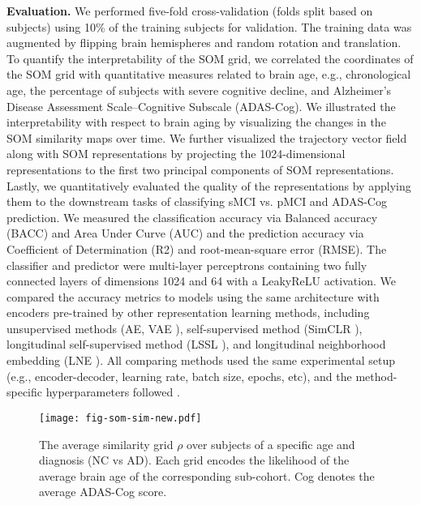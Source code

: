 \documentclass[runningheads]{llncs}
\begin{document}
\noindent\textbf{Evaluation.}  We performed five-fold cross-validation (folds split based on subjects) using  10\% of the training subjects for validation. The training data was augmented by flipping brain hemispheres and random rotation and translation. To quantify the interpretability of the SOM grid, we correlated the coordinates of the SOM grid with quantitative measures related to brain age, e.g., chronological age, the percentage of subjects with severe cognitive decline, and Alzheimer’s Disease Assessment Scale–Cognitive Subscale (ADAS-Cog). We illustrated the interpretability with respect to brain aging by visualizing the changes in the SOM similarity maps over time. We further visualized the trajectory vector field along with SOM representations by projecting the 1024-dimensional representations to the first two principal components of SOM representations. Lastly, we quantitatively evaluated the quality of the representations by applying them to the downstream tasks of classifying sMCI vs. pMCI and ADAS-Cog prediction. We measured the classification accuracy via Balanced accuracy (BACC) and Area Under Curve (AUC) and the prediction accuracy via Coefficient of Determination (R2) and root-mean-square error (RMSE). The classifier and predictor were multi-layer perceptrons containing two fully connected layers of dimensions 1024 and 64 with a LeakyReLU activation. We compared the accuracy metrics to models using the same architecture with encoders pre-trained by other representation learning methods, including unsupervised methods (AE, VAE \cite{kingma2013auto}), self-supervised method (SimCLR \cite{chen2020simple}), longitudinal self-supervised method (LSSL \cite{zhao2020lssl}), and longitudinal neighborhood embedding (LNE \cite{ouyang2021self}). All comparing methods used the same experimental setup (e.g., encoder-decoder, learning rate, batch size, epochs, etc), and the method-specific hyperparameters followed \cite{ouyang2021self}.

\begin{figure}[!t]
\centering
\texttt{[image: fig-som-sim-new.pdf]}
\caption{The average similarity grid $\rho$ over subjects of a specific age and diagnosis (NC vs AD). Each grid encodes the likelihood of the average brain age of the corresponding sub-cohort. Cog denotes the average ADAS-Cog score.}
\label{fig:som-sim}
\end{figure}
\end{document}
